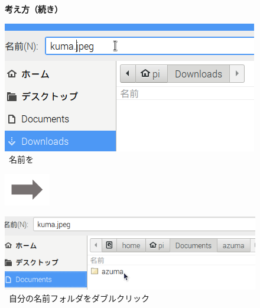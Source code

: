 \clearpage

\begin{figure}[t]
  \flushleft
  \textbf{考え方（続き）}

  \centering

  \begin{minipage}{0.4\textwidth}
    \includegraphics[width=\linewidth]{text01-img/textbook-img097.png}
     \ 名前を
  \end{minipage}
  \includegraphics[width=2cm]{text01-img/textbook-img073.png}
  \begin{minipage}{0.4\textwidth}
    \includegraphics[width=\linewidth]{text01-img/textbook-img098.png}
     \ 自分の名前フォルダをダブルクリック
  \end{minipage}

  \bigskip


\end{figure}
